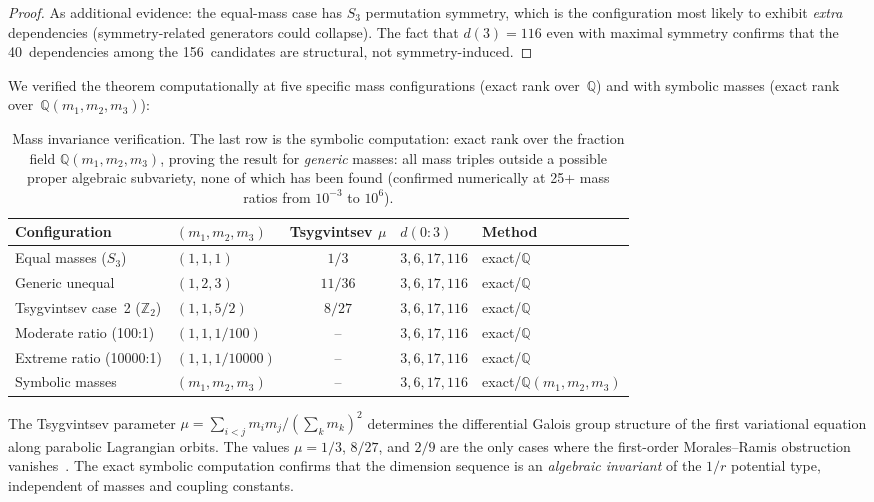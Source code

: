 \documentclass[11pt,a4paper]{article}
\theoremstyle{remark}
\newcommand{\Q}{\mathbb{Q}}
\begin{document}
\begin{proof}
As additional evidence: the equal-mass case has $S_3$ permutation
symmetry, which is the configuration most likely to exhibit
\emph{extra} dependencies (symmetry-related generators could
collapse).  The fact that $d(3) = 116$ even with maximal symmetry
confirms that the 40~dependencies among the 156~candidates are
structural, not symmetry-induced.
\end{proof}

We verified the theorem computationally at five specific mass
configurations (exact rank over~$\Q$) and with symbolic masses
(exact rank over~$\Q(m_1,m_2,m_3)$):
\begin{table}[ht]
\centering
\begin{tabular}{@{}llcll@{}}
\toprule
Configuration & $(m_1, m_2, m_3)$ & Tsygvintsev $\mu$ & $d(0{:}3)$ & Method \\
\midrule
Equal masses ($S_3$) & $(1,1,1)$ & $1/3$ & $3,6,17,116$ & exact/$\Q$ \\
Generic unequal & $(1,2,3)$ & $11/36$ & $3,6,17,116$ & exact/$\Q$ \\
Tsygvintsev case~2 ($\mathbb{Z}_2$) & $(1,1,5/2)$ & $8/27$ & $3,6,17,116$ & exact/$\Q$ \\
Moderate ratio (100:1) & $(1,1,1/100)$ & -- & $3,6,17,116$ & exact/$\Q$ \\
Extreme ratio (10000:1) & $(1,1,1/10000)$ & -- & $3,6,17,116$ & exact/$\Q$ \\
\midrule
Symbolic masses & $(m_1,m_2,m_3)$ & -- & $3,6,17,116$ & exact/$\Q(m_1,m_2,m_3)$ \\
\bottomrule
\end{tabular}
\caption{Mass invariance verification.  The last row is the
symbolic computation: exact rank over the fraction field
$\Q(m_1,m_2,m_3)$, proving the result for \emph{generic} masses:
all mass triples outside a possible proper algebraic
subvariety, none of which has been found (confirmed numerically
at 25+ mass ratios from $10^{-3}$ to $10^6$).}
\label{tab:mass-inv}
\end{table}

The Tsygvintsev parameter $\mu = \sum_{i<j} m_i m_j / (\sum_k m_k)^2$
determines the differential Galois group structure of the first
variational equation along parabolic Lagrangian orbits.  The
values $\mu = 1/3$, $8/27$, and $2/9$ are the only cases where
the first-order Morales--Ramis obstruction
vanishes~\cite{tsygvintsev-2007}.  The exact symbolic computation
confirms that the dimension sequence is an \emph{algebraic invariant}
of the $1/r$ potential type, independent of masses and
coupling constants.
\end{document}

